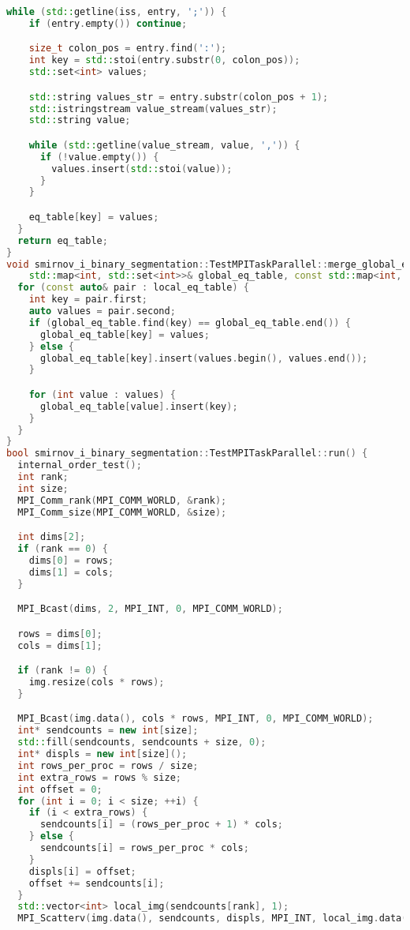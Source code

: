 \documentclass[a4paper,12pt]{article}
\begin{document}
\begin{lstlisting}[language=C++,caption={Фрагмент MPI-версии}]
  while (std::getline(iss, entry, ';')) {
    if (entry.empty()) continue;

    size_t colon_pos = entry.find(':');
    int key = std::stoi(entry.substr(0, colon_pos));
    std::set<int> values;

    std::string values_str = entry.substr(colon_pos + 1);
    std::istringstream value_stream(values_str);
    std::string value;

    while (std::getline(value_stream, value, ',')) {
      if (!value.empty()) {
        values.insert(std::stoi(value));
      }
    }

    eq_table[key] = values;
  }
  return eq_table;
}
void smirnov_i_binary_segmentation::TestMPITaskParallel::merge_global_eq_table(
    std::map<int, std::set<int>>& global_eq_table, const std::map<int, std::set<int>>& local_eq_table) {
  for (const auto& pair : local_eq_table) {
    int key = pair.first;
    auto values = pair.second;
    if (global_eq_table.find(key) == global_eq_table.end()) {
      global_eq_table[key] = values;
    } else {
      global_eq_table[key].insert(values.begin(), values.end());
    }

    for (int value : values) {
      global_eq_table[value].insert(key);
    }
  }
}
bool smirnov_i_binary_segmentation::TestMPITaskParallel::run() {
  internal_order_test();
  int rank;
  int size;
  MPI_Comm_rank(MPI_COMM_WORLD, &rank);
  MPI_Comm_size(MPI_COMM_WORLD, &size);

  int dims[2];
  if (rank == 0) {
    dims[0] = rows;
    dims[1] = cols;
  }

  MPI_Bcast(dims, 2, MPI_INT, 0, MPI_COMM_WORLD);

  rows = dims[0];
  cols = dims[1];

  if (rank != 0) {
    img.resize(cols * rows);
  }

  MPI_Bcast(img.data(), cols * rows, MPI_INT, 0, MPI_COMM_WORLD);
  int* sendcounts = new int[size];
  std::fill(sendcounts, sendcounts + size, 0);
  int* displs = new int[size]();
  int rows_per_proc = rows / size;
  int extra_rows = rows % size;
  int offset = 0;
  for (int i = 0; i < size; ++i) {
    if (i < extra_rows) {
      sendcounts[i] = (rows_per_proc + 1) * cols;
    } else {
      sendcounts[i] = rows_per_proc * cols;
    }
    displs[i] = offset;
    offset += sendcounts[i];
  }
  std::vector<int> local_img(sendcounts[rank], 1);
  MPI_Scatterv(img.data(), sendcounts, displs, MPI_INT, local_img.data(), sendcounts[rank], MPI_INT, 0, MPI_COMM_WORLD);


\end{lstlisting}
\end{document}
